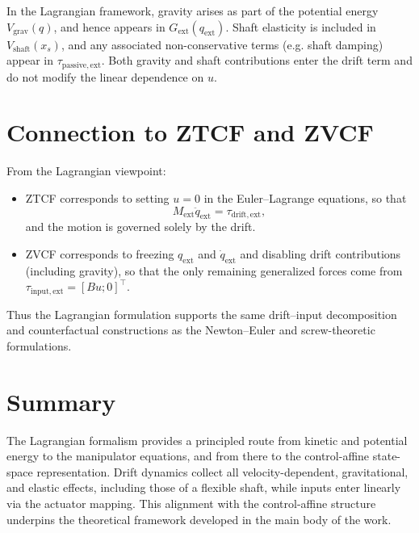 \documentclass[12pt]{article}
\begin{document}
In the Lagrangian framework, gravity arises as part of the potential energy $V_{\mathrm{grav}}(q)$, and hence appears in $G_{\mathrm{ext}}(q_{\mathrm{ext}})$. Shaft elasticity is included in $V_{\mathrm{shaft}}(x_s)$, and any associated non-conservative terms (e.g. shaft damping) appear in $\tau_{\mathrm{passive,ext}}$. Both gravity and shaft contributions enter the drift term and do not modify the linear dependence on $u$.

\section{Connection to ZTCF and ZVCF}

From the Lagrangian viewpoint:
\begin{itemize}
\item ZTCF corresponds to setting $u = 0$ in the Euler--Lagrange equations, so that
\[
M_{\mathrm{ext}}\ddot{q}_{\mathrm{ext}} = \tau_{\mathrm{drift,ext}},
\]
and the motion is governed solely by the drift.
\item ZVCF corresponds to freezing $q_{\mathrm{ext}}$ and $\dot{q}_{\mathrm{ext}}$ and disabling drift contributions (including gravity), so that the only remaining generalized forces come from $\tau_{\mathrm{input,ext}} = [B u; 0]^\top$.
\end{itemize}
Thus the Lagrangian formulation supports the same drift--input decomposition and counterfactual constructions as the Newton--Euler and screw-theoretic formulations.

\section{Summary}

The Lagrangian formalism provides a principled route from kinetic and potential energy to the manipulator equations, and from there to the control-affine state-space representation. Drift dynamics collect all velocity-dependent, gravitational, and elastic effects, including those of a flexible shaft, while inputs enter linearly via the actuator mapping. This alignment with the control-affine structure underpins the theoretical framework developed in the main body of the work.
\end{document}
